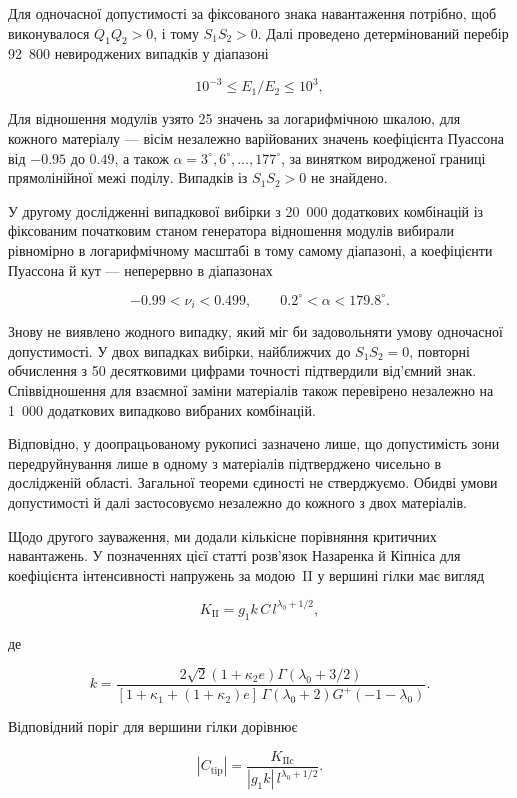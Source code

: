 \documentclass[11pt]{article}
\begin{document}
Для одночасної допустимості за фіксованого знака навантаження потрібно, щоб виконувалося \(Q_1Q_2>0\), і тому \(S_1S_2>0\). Далі проведено детермінований перебір 92~800 невироджених випадків у діапазоні

\[
10^{-3}\le E_1/E_2\le10^3,
\]

Для відношення модулів узято 25 значень за логарифмічною шкалою, для кожного матеріалу — вісім незалежно варійованих значень коефіцієнта Пуассона від \(-0.95\) до \(0.49\), а також \(\alpha=3^\circ,6^\circ,\ldots,177^\circ\), за винятком виродженої границі прямолінійної межі поділу. Випадків із \(S_1S_2>0\) не знайдено.

У другому дослідженні випадкової вибірки з 20~000 додаткових комбінацій із фіксованим початковим станом генератора відношення модулів вибирали рівномірно в логарифмічному масштабі в тому самому діапазоні, а коефіцієнти Пуассона й кут — неперервно в діапазонах

\[
-0.99<\nu_i<0.499,
\qquad
0.2^\circ<\alpha<179.8^\circ.
\]

Знову не виявлено жодного випадку, який міг би задовольняти умову одночасної допустимості. У двох випадках вибірки, найближчих до \(S_1S_2=0\), повторні обчислення з 50 десятковими цифрами точності підтвердили від’ємний знак. Співвідношення для взаємної заміни матеріалів також перевірено незалежно на 1~000 додаткових випадково вибраних комбінацій.

Відповідно, у доопрацьованому рукописі зазначено лише, що допустимість зони передруйнування лише в одному з матеріалів підтверджено чисельно в дослідженій області. Загальної теореми єдиності не стверджуємо. Обидві умови допустимості й далі застосовуємо незалежно до кожного з двох матеріалів.

Щодо другого зауваження, ми додали кількісне порівняння критичних навантажень. У позначеннях цієї статті розв’язок Назаренка й Кіпніса для коефіцієнта інтенсивності напружень за модою~II у вершині гілки має вигляд

\[
K_{\mathrm{II}}
=
g_1k\,C\,l^{\lambda_0+1/2},
\]

де

\[
k=
\frac{
2\sqrt{2}(1+\kappa_2e)\Gamma(\lambda_0+3/2)
}{
[1+\kappa_1+(1+\kappa_2)e]\,
\Gamma(\lambda_0+2)G^+(-1-\lambda_0)
}.
\]

Відповідний поріг для вершини гілки дорівнює

\[
|C_{\mathrm{tip}}|
=
\frac{K_{\mathrm{IIc}}}
{|g_1k|\,l^{\lambda_0+1/2}}.
\]
\end{document}
